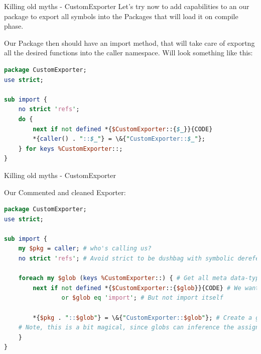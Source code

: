 \documentclass[10pt]{beamer}
\begin{document}
\begin{frame}[fragile]{Killing old myths - CustomExporter}
Let's try now to add capabilities to an our package to export all symbols into the Packages that will load it on compile phase. \\
\pause

Our Package then should have an import method, that will take care of exportng all the desired functions into the caller namespace. Will look something like this:
\begin{lstlisting}[language=perl]
package CustomExporter;
use strict;

sub import {
    no strict 'refs';
    do {
        next if not defined *{$CustomExporter::{$_}}{CODE}              or $_ eq 'import';
        *{caller() . "::$_"} = \&{"CustomExporter::$_"};
    } for keys %CustomExporter::;
}
\end{lstlisting}

\pause


\end{frame}


\begin{frame}[fragile]{Killing old myths - CustomExporter}

Our Commented and cleaned Exporter:
\begin{lstlisting}[language=perl]
package CustomExporter;
use strict;

sub import {
    my $pkg = caller; # who's calling us?
    no strict 'refs'; # Avoid strict to be dushbag with symbolic dereference

    foreach my $glob (keys %CustomExporter::) { # Get all meta data-types in the package
        next if not defined *{$CustomExporter::{$glob}}{CODE} # We want to put in caller only functions
                or $glob eq 'import'; # But not import itself

        *{$pkg . "::$glob"} = \&{"CustomExporter::$glob"}; # Create a glob for the package.
	# Note, this is a bit magical, since globs can inference the assigned type.
    }
}
\end{lstlisting}

\pause


\end{frame}
\end{document}
